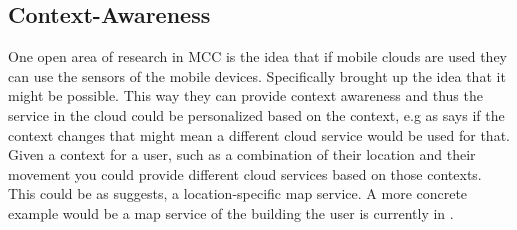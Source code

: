 \subsection{Context-Awareness}
One open area of research in MCC is the idea that if mobile clouds are used they can use the sensors of the mobile devices. 
Specifically \citet{5557960} brought up the idea that it might be possible.
This way they can provide context awareness and thus the service in the cloud could be personalized based on the context, e.g as \citet{fernando2013mobile} says if the context changes that might mean a different cloud service would be used for that. 
Given a context for a user, such as a combination of their location and their movement you could provide different cloud services based on those contexts. 
This could be as \citet{5557960} suggests, a location-specific map service. 
A more concrete example would be a map service of the building the user is currently in \citep{sanaei2014heterogeneity}.
